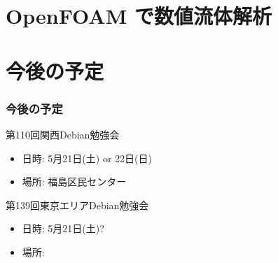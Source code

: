 \documentclass[cjk,dvipdfmx,10pt,compress,%
hyperref={bookmarks=true,bookmarksnumbered=true,bookmarksopen=false,%
colorlinks=false,%
pdftitle={第 109 回 関西 Debian 勉強会},%
pdfauthor={倉敷・のがた・佐々木・かわだ},%
pdfsubject={資料},%
}]{beamer}
\begin{document}

\section{OpenFOAM で数値流体解析}

\section{今後の予定}
\begin{frame}[fragile]
  \frametitle{今後の予定}

  \begin{block}{第110回関西Debian勉強会}
    \begin{itemize}
    \item 日時: 5月21日(土) or 22日(日)
    \item 場所: 福島区民センター
    \end{itemize}
  \end{block}

  \begin{block}{第139回東京エリアDebian勉強会}
    \begin{itemize}
    \item 日時: 5月21日(土)?
    \item 場所:
    \end{itemize}
  \end{block}

\end{frame}

\takahashi[50]{  }
\end{document}
